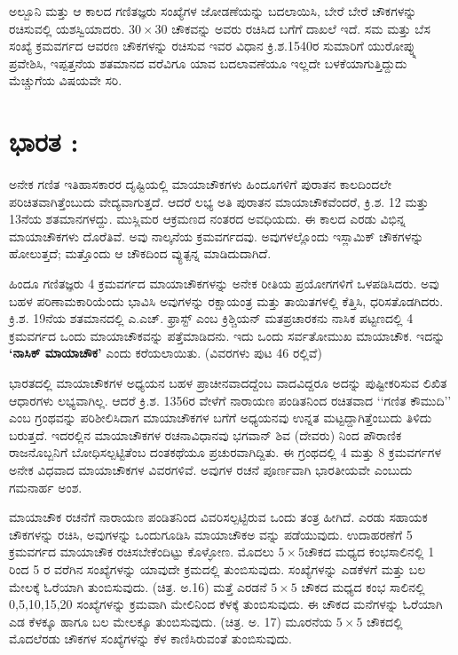 ಅಲ್ಬೂನಿ ಮತ್ತು ಆ ಕಾಲದ ಗಣಿತಜ್ಞರು ಸಂಖ್ಯೆಗಳ ಜೋಡಣೆಯನ್ನು ಬದಲಾಯಿಸಿ, ಬೇರೆ ಬೇರೆ ಚೌಕಗಳನ್ನು ರಚಿಸುವಲ್ಲಿ ಯಶಸ್ವಿಯಾದರು. $30 \times 30$ ಚೌಕವನ್ನು ಅವರು ರಚಿಸಿದ ಬಗೆಗೆ ದಾಖಲೆ ಇದೆ. ಸಮ ಮತ್ತು ಬೆಸ ಸಂಖ್ಯೆ ಕ್ರಮವರ್ಗದ ಆವರಣ ಚೌಕಗಳನ್ನು ರಚಿಸುವ ಇವರ ವಿಧಾನ ಕ್ರಿ.ಶ.1540ರ ಸುಮಾರಿಗೆ ಯುರೋಪ್ನ್ನು ಪ್ರವೇಶಿಸಿ, ಇಪ್ಪತ್ತನೆಯ ಶತಮಾನದ ವರೆವಿಗೂ ಯಾವ ಬದಲಾವಣೆಯೂ ಇಲ್ಲದೇ ಬಳಕೆಯಾಗುತ್ತಿದ್ದುದು ಮೆಚ್ಚುಗೆಯ ವಿಷಯವೇ ಸರಿ.

\section*{ಭಾರತ :}

ಅನೇಕ ಗಣಿತ ಇತಿಹಾಸಕಾರರ ದೃಷ್ಟಿಯಲ್ಲಿ ಮಾಯಾಚೌಕಗಳು ಹಿಂದೂಗಳಿಗೆ ಪುರಾತನ ಕಾಲದಿಂದಲೇ ಪರಿಚಿತವಾಗಿತ್ತೆಂಬುದು ವೇದ್ಯವಾಗುತ್ತದೆ. ಆದರೆ ಲಭ್ಯ ಅತಿ ಪುರಾತನ ಮಾಯಾಚೌಕವೆಂದರೆ, ಕ್ರಿ.ಶ. 12 ಮತ್ತು 13ನೆಯ ಶತಮಾನಗಳದ್ದು. ಮುಸ್ಲಿಮರ ಆಕ್ರಮಣದ ನಂತರದ ಅವಧಿಯದು. ಈ ಕಾಲದ ಎರಡು ವಿಭಿನ್ನ ಮಾಯಾಚೌಕಗಳು ದೊರೆತಿವೆ. ಅವು ನಾಲ್ಕನೆಯ ಕ್ರಮವರ್ಗದವು. ಅವುಗಳಲ್ಲೊಂದು ಇಸ್ಲಾಮಿಕ್ ಚೌಕಗಳನ್ನು ಹೋಲುತ್ತದೆ; ಮತ್ತೊಂದು ಆ ಚೌಕದಿಂದ ವ್ಯುತ್ಪನ್ನ ಮಾಡಿದುದಾಗಿದೆ.

ಹಿಂದೂ ಗಣಿತಜ್ಞರು 4 ಕ್ರಮವರ್ಗದ ಮಾಯಾಚೌಕಗಳನ್ನು ಅನೇಕ ರೀತಿಯ ಪ್ರಯೋಗಗಳಿಗೆ ಒಳಪಡಿಸಿದರು. ಅವು ಬಹಳ ಪರಿಣಾಮಕಾರಿಯೆಂದು ಭಾವಿಸಿ ಅವುಗಳನ್ನು ರಕ್ಷಾಯಂತ್ರ ಮತ್ತು ತಾಯಿತಗಳಲ್ಲಿ ಕೆತ್ತಿಸಿ, ಧರಿಸತೊಡಗಿದರು. ಕ್ರಿ.ಶ. 19ನೆಯ ಶತಮಾನದಲ್ಲಿ ಎ.ಎಚ್. ಫ್ರಾಸ್ಟ್ ಎಂಬ ಕ್ರಿಶ್ಚಿಯನ್ ಮತಪ್ರಚಾರಕನು ನಾಸಿಕ ಪಟ್ಟಣದಲ್ಲಿ 4 ಕ್ರಮವರ್ಗದ ಒಂದು ಮಾಯಾಚೌಕವನ್ನು ಪತ್ತೆಮಾಡಿದನು. ಇದು ಒಂದು ಸರ್ವತೋಮುಖ ಮಾಯಾಚೌಕ. ಇದನ್ನು \textbf{‘ನಾಸಿಕ್ ಮಾಯಾಚೌಕ’} ಎಂದು ಕರೆಯಲಾಯಿತು. (ವಿವರಗಳು ಪುಟ 46 ರಲ್ಲಿವೆ)

ಭಾರತದಲ್ಲಿ ಮಾಯಾಚೌಕಗಳ ಅಧ್ಯಯನ ಬಹಳ ಪ್ರಾಚೀನವಾದದ್ದೆಂಬ ವಾದವಿದ್ದರೂ ಅದನ್ನು ಪುಷ್ಟೀಕರಿಸುವ ಲಿಖಿತ ಆಧಾರಗಳು ಲಭ್ಯವಾಗಿಲ್ಲ. ಆದರೆ ಕ್ರಿ.ಶ. 1356ರ ವೇಳೆಗೆ ನಾರಾಯಣ ಪಂಡಿತನಿಂದ ರಚಿತವಾದ ‘‘ಗಣಿತ ಕೌಮುದಿ’’ ಎಂಬ ಗ್ರಂಥವನ್ನು ಪರಿಶೀಲಿಸಿದಾಗ ಮಾಯಾಚೌಕಗಳ ಬಗೆಗೆ ಅಧ್ಯಯನವು ಉನ್ನತ ಮಟ್ಟದ್ದಾಗಿತ್ತೆಂಬುದು ತಿಳಿದು ಬರುತ್ತದೆ. ಇದರಲ್ಲಿನ ಮಾಯಾಚೌಕಗಳ ರಚನಾವಿಧಾನವು ಭಗವಾನ್ ಶಿವ (ದೇವರು) ನಿಂದ ಪೌರಾಣಿಕ ರಾಜನೊಬ್ಬನಿಗೆ ಬೋಧಿಸಲ್ಪಟ್ಟಿತೆಂಬ ದಂತಕಥೆಯೂ ಪ್ರಚುರವಾಗಿದ್ದಿತು. ಈ ಗ್ರಂಥದಲ್ಲಿ 4 ಮತ್ತು 8 ಕ್ರಮವರ್ಗಗಳ ಅನೇಕ ವಿಧವಾದ ಮಾಯಾಚೌಕಗಳ ವಿವರಗಳಿವೆ. ಅವುಗಳ ರಚನೆ ಪೂರ್ಣವಾಗಿ ಭಾರತೀಯವೇ ಎಂಬುದು ಗಮನಾರ್ಹ ಅಂಶ.

ಮಾಯಾಚೌಕ ರಚನೆಗೆ ನಾರಾಯಣ ಪಂಡಿತನಿಂದ ವಿವರಿಸಲ್ಪಟ್ಟಿರುವ ಒಂದು ತಂತ್ರ ಹೀಗಿದೆ. ಎರಡು ಸಹಾಯಕ ಚೌಕಗಳನ್ನು ರಚಿಸಿ, ಅವುಗಳನ್ನು ಒಂದುಗೂಡಿಸಿ ಮಾಯಾಚೌಕಅ ವನ್ನು ಪಡೆಯುವುದು. ಉದಾಹರಣೆಗೆ 5 ಕ್ರಮವರ್ಗದ ಮಾಯಾಚೌಕ ರಚಿಸಬೇಕೆಂದಿಟ್ಟು ಕೊಳ್ಳೋಣ. ಮೊದಲು $5 \times 5$ಚೌಕದ ಮಧ್ಯದ ಕಂಭಸಾಲಿನಲ್ಲಿ 1 ರಿಂದ 5 ರ ವರೆಗಿನ ಸಂಖ್ಯೆಗಳನ್ನು ಯಾವುದೇ ಕ್ರಮದಲ್ಲಿ ತುಂಬಿಸುವುದು. ಸಂಖ್ಯೆಗಳನ್ನು ಎಡಕೆಳಗೆ ಮತ್ತು ಬಲ ಮೇಲಕ್ಕೆ ಓರೆಯಾಗಿ ತುಂಬಿಸುವುದು. (ಚಿತ್ರ. ಅ.16) ಮತ್ತೆ ಎರಡನೆ $5 \times 5$ ಚೌಕದ ಮಧ್ಯದ ಕಂಭ ಸಾಲಿನಲ್ಲಿ 0,5,10,15,20 ಸಂಖ್ಯೆಗಳನ್ನು ಕ್ರಮವಾಗಿ ಮೇಲಿನಿಂದ ಕೆಳಕ್ಕೆ ತುಂಬಿಸುವುದು. ಈ ಚೌಕದ ಮನೆಗಳನ್ನು ಓರೆಯಾಗಿ ಎಡ ಕೆಳಕ್ಕೂ ಹಾಗೂ ಬಲ ಮೇಲಕ್ಕೂ ತುಂಬಿಸುವುದು. (ಚಿತ್ರ. ಅ. 17) ಮೂರನೆಯ $5 \times 5$ ಚೌಕದಲ್ಲಿ ಮೊದಲೆರಡು ಚೌಕಗಳ ಸಂಖ್ಯೆಗಳನ್ನು ಕೆಳ ಕಾಣಿಸಿರುವಂತೆ ತುಂಬಿಸುವುದು.

